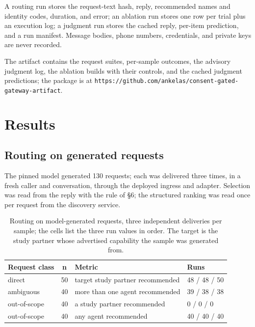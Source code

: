 \documentclass[runningheads,a4paper]{llncs}
\begin{document}
A routing run stores the request-text hash, reply, recommended names and identity codes, duration, and error; an ablation run stores one row per trial plus an execution log; a judgment run stores the cached reply, per-item prediction, and a run manifest. Message bodies, phone numbers, credentials, and private keys are never recorded.

The artifact contains the request suites, per-sample outcomes, the advisory judgment log, the ablation builds with their controls, and the cached judgment predictions; the package is at \texttt{https:/\allowbreak{}/\allowbreak{}github.com/\allowbreak{}ankelas/\allowbreak{}consent-\allowbreak{}gated-ga\allowbreak{}teway-ar\allowbreak{}tifact}.

\section{Results}

\subsection{Routing on generated requests}

The pinned model generated 130 requests; each was delivered three times, in a fresh caller and conversation, through the deployed ingress and adapter. Selection was read from the reply with the rule of §6; the structured ranking was read once per request from the discovery service.

\begin{table}[htbp]

\centering

\small

\caption{Routing on model-generated requests, three independent deliveries per sample; the cells list the three run values in order. The target is the study partner whose advertised capability the sample was generated from.}\label{tab:4}

\begin{tabularx}{\textwidth}{@{}lcXp{2.6cm}@{}}

\toprule

\textbf{Request class} & \textbf{n} & \textbf{Metric} & \textbf{Runs} \\

\midrule

direct & 50 & target study partner recommended & 48 / 48 / 50 \\

ambiguous & 40 & more than one agent recommended & 39 / 38 / 38 \\

out-of-scope & 40 & a study partner recommended & 0 / 0 / 0 \\

out-of-scope & 40 & any agent recommended & 40 / 40 / 40 \\

\bottomrule

\end{tabularx}

\end{table}
\end{document}
